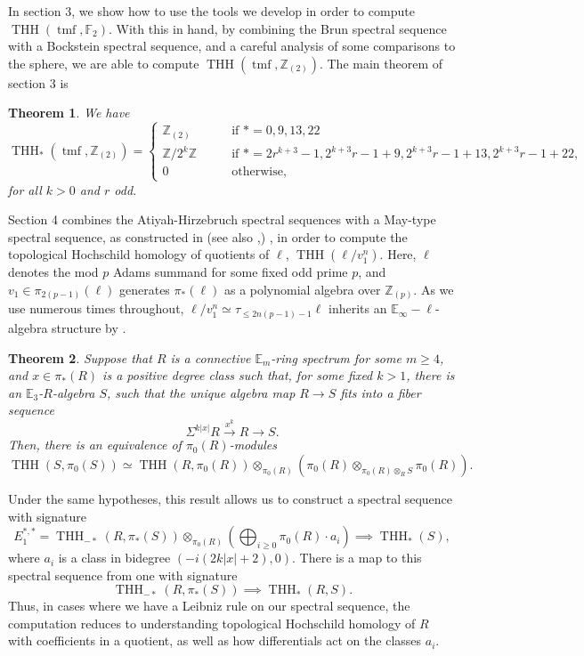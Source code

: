 \documentclass[11pt,leqno]{article}
\newcommand{\zz}{\mathbb{Z}}
\newcommand{\bb}[1]{\mathbb{#1}}
\newcommand{\fff}{\mathbb{F}}
\DeclareMathOperator{\THH}{THH}
\DeclareMathOperator{\tmf}{tmf}
\newtheorem*{short hand}{theorem name}
\theoremstyle{plain}  %
\newtheorem{theorem}{Theorem}[section]
\theoremstyle{definition}
\numberwithin{equation}{section}
\begin{document}
	 In section 3, we show how to use the tools we develop in order to compute $\THH(\tmf,\fff_2)$.  With this in hand, by combining the Brun spectral sequence with a Bockstein spectral sequence, and a careful analysis of some comparisons to the sphere, we are able to compute $\THH(\tmf,\zz_{(2)})$.  The main theorem of section 3 is 
	 \begin{theorem}\label{th1.1}  We have
	 	$$\THH_*(\tmf,\zz_{(2)})=\begin{cases}
	 		\zz_{(2)} & \qquad \text{if } *=0,9,13,22\\
	 		\zz/2^k\zz & \qquad \text{if } *=2r^{k+3}-1, 2^{k+3}r-1+9, 2^{k+3}r-1+13, 2^{k+3}r-1+22,\\
	 		0 & \qquad \text{otherwise},
	 	\end{cases}$$
	 	for all $k>0$ and $r$ odd.
	 \end{theorem}
 Section 4 combines the Atiyah-Hirzebruch spectral sequences with a May-type spectral sequence, as constructed in \cite{angeltveit2015algebraic} (see also \cite{AngeliniKnoll2018},\cite{keenan2020filtration}) , in order to compute the topological Hochschild homology of quotients of $\ell$, $\THH(\ell/v_1^n)$.  Here, $\ell$ denotes the mod $p$ Adams summand for some fixed odd prime $p$, and $v_1\in \pi_{2(p-1)}(\ell)$ generates $\pi_*(\ell)$ as a polynomial algebra over $\zz_{(p)}$.  As we use numerous times throughout, $\ell/v_1^n\simeq\tau_{\leq 2n(p-1)-1}\ell$ inherits an $\bb{E}_{\infty}-\ell$-algebra structure by \cite[~Proposition 7.1.3.15]{HA}.
 \begin{theorem}\label{th1.2}
 	Suppose that $R$ is a connective $\bb{E}_{m}$-ring spectrum for some $m\geq 4$, and $x\in \pi_{*}(R)$ is a positive degree class such that, for some fixed $k>1$, there is an $\bb{E}_3$-$R$-algebra $S$, such that the unique algebra map $R\to S$ fits into a fiber sequence $$\Sigma^{k|x|}R\xrightarrow{x^k}R\to S.$$   Then, there is an equivalence of $\pi_0(R)$-modules $$\THH(S,\pi_0(S))\simeq \THH(R,\pi_0(R))\otimes_{\pi_0(R)}(\pi_0(R)\otimes_{\pi_0(R) \otimes_{R} S}\pi_0(R)).$$
 \end{theorem}
\noindent Under the same hypotheses, this result allows us to construct a spectral sequence with signature $$E_1^{*,*}=\THH_{-*}(R,\pi_*(S))\otimes_{\pi_0(R)}(\bigoplus_{i\geq 0}\pi_0(R)\cdot a_i)\implies \THH_{*}(S),$$ where $a_i$ is a class in bidegree $(-i(2k|x|+2),0)$.  There is a map to this spectral sequence from one with signature $$\THH_{-*}(R,\pi_*(S))\implies \THH_{*}(R,S).$$  Thus, in cases where we have a Leibniz rule on our spectral sequence, the computation reduces to understanding topological Hochschild homology of $R$ with coefficients in a quotient, as well as how differentials act on the classes $a_i$.
\end{document}
